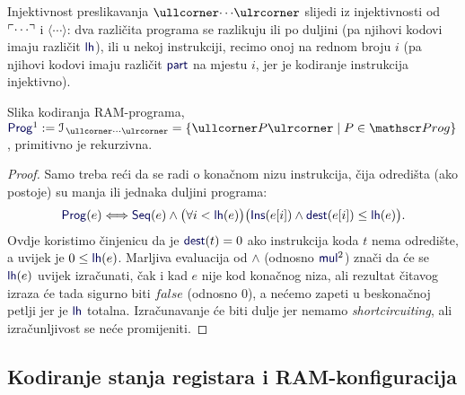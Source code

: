 Injektivnost preslikavanja $\kprog{\cdots}$ slijedi iz injektivnosti od $\ulcorner\cdots\urcorner$ i $\langle\cdots\rangle$: dva različita programa se razlikuju ili po duljini (pa njihovi kodovi imaju različit $\f{lh}$), ili u nekoj instrukciji, recimo onoj na rednom broju $i$ (pa njihovi kodovi imaju različit $\f{part}$ na mjestu $i$, jer je kodiranje instrukcija injektivno).

\begin{lema}[{name=[primitivna rekurzivnost slike kodiranja RAM-programa]}]
    Slika kodiranja RAM-programa, $\f{Prog}^1:=\im{\,\kprog{\cdots}}=\{\kprog P\mid P\in\mathscr Prog\}$, primitivno je rekurzivna.
\end{lema}
\begin{proof}
Samo treba reći da se radi o konačnom nizu instrukcija, čija odredišta (ako postoje) su manja ili jednaka duljini programa:
\begin{equation}\label{eq:Progget}
    \f{Prog}(e)\Longleftrightarrow\f{Seq}(e)\wedge\bigl(\forall i<\f{lh}(e)\bigr)\bigl(\f{Ins}(e[i])\land\f{dest}(e[i])\le \f{lh}(e)\bigr)\text.\\
\end{equation}
Ovdje koristimo činjenicu da je $\f{dest}(t)\eq0$ ako instrukcija koda $t$ nema od\-re\-di\-šte, a uvijek je $0\le\f{lh}(e)$. Marljiva evaluacija od $\land$ (odnosno $\f{mul}^2$) znači da će se $\f{lh}(e)$ uvijek izračunati, čak i kad $e$ nije kod konačnog niza, ali rezultat čitavog izraza će tada sigurno biti $\mathit{false}$ (odnosno $0$), a nećemo zapeti u beskonačnoj petlji jer je $\f{lh}$ totalna. Izračunavanje će biti dulje jer nemamo \emph{shortcircuiting}, ali izračunljivost se neće promijeniti.
\end{proof}




\subsection{Kodiranje stanja registara i RAM-konfiguracija}

